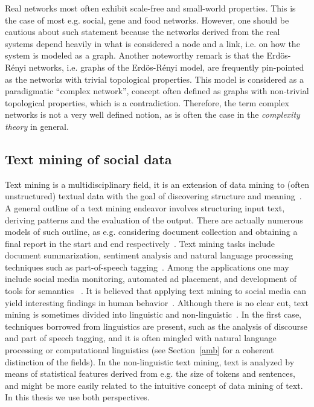 Real networks most often exhibit scale-free and small-world properties.
This is the case of most e.g. social, gene and food networks.
However, one should be cautious about such statement because
the networks derived from the real systems depend heavily
in what is considered a node and a link,
i.e. on how the system is modeled as a graph.
Another noteworthy remark is that
the Erdös-Rényi networks, i.e. graphs of the Erdös-Rényi model, are frequently pin-pointed as the networks with trivial
topological properties.
This model is considered as a paradigmatic ``complex network'', concept often defined as graphs with non-trivial topological properties,
which is a contradiction. Therefore, the term complex networks is not a very well defined notion,
as is often the case in the \emph{complexity theory} in general.


\subsection{Text mining of social data}
Text mining is a multidisciplinary field,
it is an extension of data mining to (often unstructured) textual data
with the goal of discovering structure and meaning~\cite{customText}.
A general outline of a text mining endeavor involves structuring input text,
deriving patterns and the evaluation of the output.
There are actually numerous models of such outline,
as e.g. considering document collection and obtaining a final report in the
start and end respectively~\cite{textSurvey}.
Text mining tasks include document summarization, sentiment analysis
and natural language processing techniques such as part-of-speech tagging~\cite{nltk}.
Among the applications one may include social media monitoring, automated ad placement, and development of tools for 
semantics ~\cite{textSurvey}.
It is believed that applying text mining to social media
can yield interesting findings in human behavior~\cite{customText}.
Although there is no clear cut, text mining is sometimes divided into linguistic and non-linguistic~\cite{customText}.
In the first case, techniques borrowed from linguistics are present, such as
the analysis of discourse and part of speech tagging,
and it is often mingled with natural language processing or computational linguistics (see Section~\ref{amb} for a coherent distinction of the fields).
In the non-linguistic text mining, text is analyzed by means of statistical features
derived from e.g. the size of tokens and sentences,
and might be more easily related to the intuitive concept of data mining of text.
In this thesis we use both perspectives.

